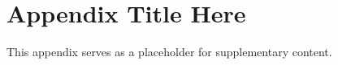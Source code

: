 
\chapter{Appendix Title Here} %

\label{AppendixA} %

This appendix serves as a placeholder for supplementary content.